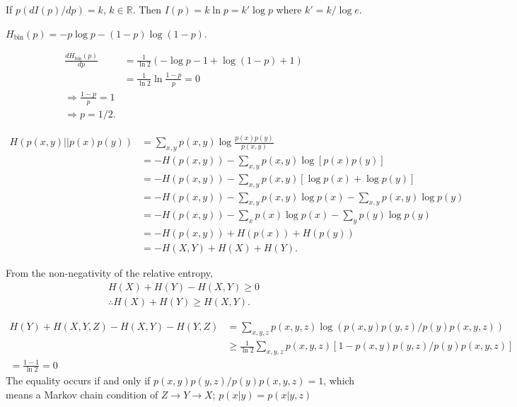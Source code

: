 If $p (d I(p) / d p) = k$, $k \in \mathds{R}$.
Then $I(p) = k \ln p = k' \log p$ where $k' = k / \log e$.



$H_{\text{bin}}(p) = - p\log p - (1-p) \log (1-p)$.

\begin{align}
    \frac{d H_{\text{bin}}(p)}{d p}
        &= \frac{1}{\ln 2} \left( - \log p - 1 + \log (1-p) + 1 \right)\\
        &= \frac{1}{\ln 2} \ln \frac{1-p}{p} = 0\\
    \Rightarrow \frac{1-p}{p} = 1\\
    \Rightarrow p = 1/2.
\end{align}



\begin{align}
    H\left( p(x,y) || p(x)p(y) \right)
        &= \sum_{x,y} p(x,y) \log \frac{p(x) p(y)}{p(x,y)}\\
        &= - H(p(x,y)) - \sum_{x,y} p(x,y) \log \left[ p(x)p(y) \right]\\
        &= - H(p(x,y)) - \sum_{x,y} p(x,y) \left[ \log p(x) + \log p(y) \right]\\
        &= - H(p(x,y)) - \sum_{x,y} p(x,y) \log p(x) - \sum_{x,y} p(x,y) \log p(y)\\
        &= - H(p(x,y)) - \sum_{x} p(x) \log p(x) - \sum_{y} p(y) \log p(y)\\
        &= - H(p(x,y)) + H(p(x)) + H(p(y))\\
        &= - H(X,Y) + H(X) + H(Y).
\end{align}

From the non-negativity of the relative entropy,
\begin{align}
    H(X) +  H(Y) - H(X,Y) \geq 0\\
    \therefore H(X) + H(Y) \geq H(X,Y).
\end{align}



\begin{align}
    H(Y) + H (X, Y, Z) - H(X, Y) - H(Y, Z)  
        &= \sum_{x,y,z} p(x,y,z) \log \left( p(x,y)p(y,z)/p(y)p(x,y,z) \right) \\
        &\geq \frac{1}{\ln{2}} \sum_{x,y,z} p(x,y,z) \left[1-p(x,y)p(y,z)/p(y)p(x,y,z) \right] \\
        = \frac{1-1}{\ln{2}}
        = 0
\end{align}
The equality occurs if and only if $p(x,y)p(y,z)/p(y)p(x,y,z)=1$, which means a Markov chain condition of $Z \rightarrow Y \rightarrow X$; $p(x|y)=p(x|y,z)$ 

